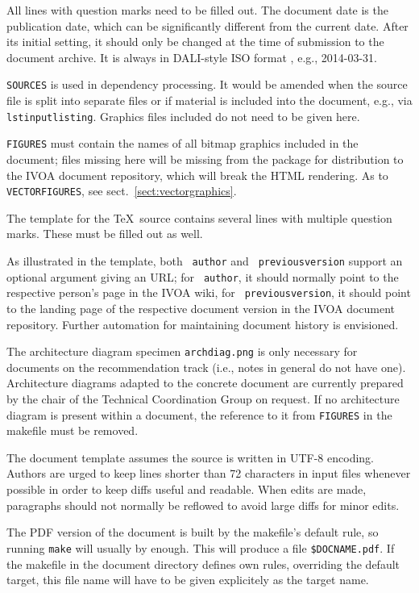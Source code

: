 \documentclass[11pt,a4paper]{ivoa}
\newcommand{\texword}[1]{\texttt{\color{texcolor} #1}}
\begin{document}
All lines with question marks need to be filled out.  The document date
is the publication date, which can be significantly different from the
current date.  After its initial setting, it should only be changed at
the time of submission to the document archive.  It is always in
DALI-style ISO format \citep{std:DALI}, e.g., 2014-03-31.

\texttt{SOURCES} is used in dependency processing.  It would be amended
when the source file is split into separate files or if material is
included into the document, e.g., via \texword{lstinputlisting}.
Graphics files included do not need to be given here.

\texttt{FIGURES} must contain the names of all bitmap graphics included
in the document; files missing here will be missing from the package for
distribution to the IVOA document repository, which will break the HTML
rendering.  As to \texttt{VECTORFIGURES}, see
sect.~\ref{sect:vectorgraphics}.

The template for the \TeX\ source contains several lines with
multiple question marks.  These must be filled out as well.

As illustrated in the template, both \texword{author} and
\texword{previousversion} support an optional argument giving an URL; for
\texword{author}, it should normally point to the respective person's
page in the IVOA wiki, for \texword{previousversion}, it should point to
the landing page of the respective document version in the IVOA document
repository.  Further automation for maintaining document history is
envisioned.

The architecture diagram specimen \texttt{archdiag.png} is only
necessary for documents on the recommendation track (i.e., notes in
general do not have one).  Architecture diagrams adapted to the concrete
document are currently prepared by the chair of the Technical
Coordination Group on request.  If no architecture diagram is present
within a document, the reference to it from \texttt{FIGURES} in the
makefile must be removed.

The document template assumes the source is written in UTF-8 encoding.
Authors are urged to keep lines shorter than 72 characters in input
files whenever possible in order to keep diffs useful and readable.
When edits are made, paragraphs should not normally be reflowed to avoid
large diffs for minor edits.

The PDF version of the document is built by the makefile's default rule,
so running \texttt{make} will usually by enough.  This will produce a
file \texttt{\$DOCNAME.pdf}.  If the makefile in the document directory
defines own rules, overriding the default target, this file name will
have to be given explicitely as the target name.
\end{document}
